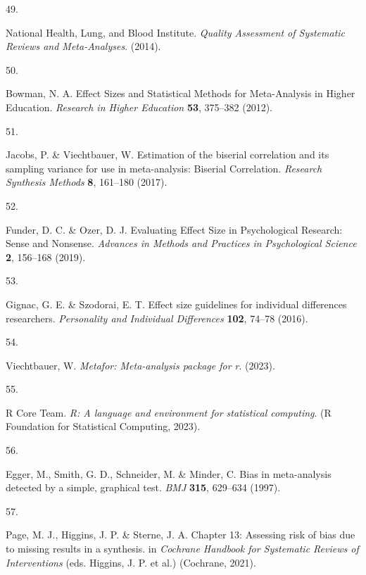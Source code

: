 \documentclass[
  english,
  man]{apa6}
\newlength{\cslhangindent}
\newlength{\csllabelwidth}
\newenvironment{CSLReferences}[2] %
 {%
  \setlength{\parindent}{0pt}
  \ifodd #1 \everypar{\setlength{\hangindent}{\cslhangindent}}\ignorespaces\fi
  \ifnum #2 > 0
  \setlength{\parskip}{#2\baselineskip}
  \fi
 }%
 {}
\newcommand{\CSLLeftMargin}[1]{\parbox[t]{\csllabelwidth}{#1}}
\newcommand{\CSLRightInline}[1]{\parbox[t]{\linewidth - \csllabelwidth}{#1}\break}
\begin{document}
\begin{CSLReferences}{0}{0}
\leavevmode{}%
\CSLLeftMargin{49. }
\CSLRightInline{National Health, Lung, and Blood Institute. \emph{Quality {Assessment} of {Systematic Reviews} and {Meta-Analyses}}. (2014).}

\leavevmode{}%
\CSLLeftMargin{50. }
\CSLRightInline{Bowman, N. A. Effect {Sizes} and {Statistical Methods} for {Meta-Analysis} in {Higher Education}. \emph{Research in Higher Education} \textbf{53}, 375--382 (2012).}

\leavevmode{}%
\CSLLeftMargin{51. }
\CSLRightInline{Jacobs, P. \& Viechtbauer, W. Estimation of the biserial correlation and its sampling variance for use in meta-analysis: {Biserial Correlation}. \emph{Research Synthesis Methods} \textbf{8}, 161--180 (2017).}

\leavevmode{}%
\CSLLeftMargin{52. }
\CSLRightInline{Funder, D. C. \& Ozer, D. J. Evaluating {Effect Size} in {Psychological Research}: {Sense} and {Nonsense}. \emph{Advances in Methods and Practices in Psychological Science} \textbf{2}, 156--168 (2019).}

\leavevmode{}%
\CSLLeftMargin{53. }
\CSLRightInline{Gignac, G. E. \& Szodorai, E. T. Effect size guidelines for individual differences researchers. \emph{Personality and Individual Differences} \textbf{102}, 74--78 (2016).}

\leavevmode{}%
\CSLLeftMargin{54. }
\CSLRightInline{Viechtbauer, W. \emph{Metafor: Meta-analysis package for r}. (2023).}

\leavevmode{}%
\CSLLeftMargin{55. }
\CSLRightInline{R Core Team. \emph{R: A language and environment for statistical computing}. (R Foundation for Statistical Computing, 2023).}

\leavevmode{}%
\CSLLeftMargin{56. }
\CSLRightInline{Egger, M., Smith, G. D., Schneider, M. \& Minder, C. Bias in meta-analysis detected by a simple, graphical test. \emph{BMJ} \textbf{315}, 629--634 (1997).}

\leavevmode{}%
\CSLLeftMargin{57. }
\CSLRightInline{Page, M. J., Higgins, J. P. \& Sterne, J. A. Chapter 13: {Assessing} risk of bias due to missing results in a synthesis. in \emph{Cochrane {Handbook} for {Systematic Reviews} of {Interventions}} (eds. Higgins, J. P. et al.) ({Cochrane}, 2021).}


\end{CSLReferences}
\end{document}
